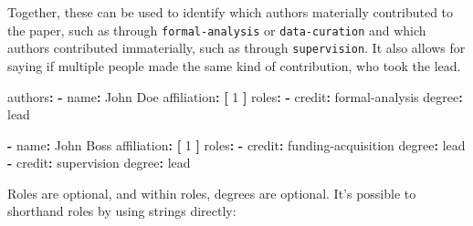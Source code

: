 \documentclass[10pt,a4paper,onecolumn]{article}
\newenvironment{Shaded}{}{}
\newcommand{\AttributeTok}[1]{\textcolor[rgb]{0.49,0.56,0.16}{#1}}
\newcommand{\DecValTok}[1]{\textcolor[rgb]{0.25,0.63,0.44}{#1}}
\newcommand{\FunctionTok}[1]{\textcolor[rgb]{0.02,0.16,0.49}{#1}}
\newcommand{\KeywordTok}[1]{\textcolor[rgb]{0.00,0.44,0.13}{\textbf{#1}}}
\newcommand{\StringTok}[1]{\textcolor[rgb]{0.25,0.44,0.63}{#1}}
\begin{document}
Together, these can be used to identify which authors materially
contributed to the paper, such as through \texttt{formal-analysis} or
\texttt{data-curation} and which authors contributed immaterially, such
as through \texttt{supervision}. It also allows for saying if multiple
people made the same kind of contribution, who took the lead.

\begin{Shaded}
\begin{Highlighting}[]
\FunctionTok{authors}\KeywordTok{:}
\AttributeTok{  }\KeywordTok{{-}}\AttributeTok{ }\FunctionTok{name}\KeywordTok{:}\AttributeTok{ John Doe}
\AttributeTok{    }\FunctionTok{affiliation}\KeywordTok{:}\AttributeTok{ }\KeywordTok{[}\AttributeTok{ }\DecValTok{1}\AttributeTok{ }\KeywordTok{]}
\AttributeTok{    }\FunctionTok{roles}\KeywordTok{:}
\AttributeTok{      }\KeywordTok{{-}}\AttributeTok{ }\FunctionTok{credit}\KeywordTok{:}\AttributeTok{ }\StringTok{\textquotesingle{}formal{-}analysis\textquotesingle{}}
\AttributeTok{        }\FunctionTok{degree}\KeywordTok{:}\AttributeTok{ }\StringTok{\textquotesingle{}lead\textquotesingle{}}

\AttributeTok{  }\KeywordTok{{-}}\AttributeTok{ }\FunctionTok{name}\KeywordTok{:}\AttributeTok{ John Boss}
\AttributeTok{    }\FunctionTok{affiliation}\KeywordTok{:}\AttributeTok{ }\KeywordTok{[}\AttributeTok{ }\DecValTok{1}\AttributeTok{ }\KeywordTok{]}
\AttributeTok{    }\FunctionTok{roles}\KeywordTok{:}
\AttributeTok{      }\KeywordTok{{-}}\AttributeTok{ }\FunctionTok{credit}\KeywordTok{:}\AttributeTok{ }\StringTok{\textquotesingle{}funding{-}acquisition\textquotesingle{}}
\AttributeTok{        }\FunctionTok{degree}\KeywordTok{:}\AttributeTok{ }\StringTok{\textquotesingle{}lead\textquotesingle{}}
\AttributeTok{      }\KeywordTok{{-}}\AttributeTok{ }\FunctionTok{credit}\KeywordTok{:}\AttributeTok{ }\StringTok{\textquotesingle{}supervision\textquotesingle{}}
\AttributeTok{        }\FunctionTok{degree}\KeywordTok{:}\AttributeTok{ }\StringTok{\textquotesingle{}lead\textquotesingle{}}
\end{Highlighting}
\end{Shaded}

Roles are optional, and within roles, degrees are optional. It's
possible to shorthand roles by using strings directly:
\end{document}

